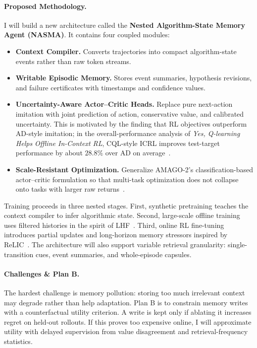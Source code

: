 \documentclass[10pt,twocolumn,letterpaper]{article}
\begin{document}
\paragraph{Proposed Methodology.}
I will build a new architecture called the \textbf{Nested Algorithm-State Memory Agent (NASMA)}. It contains four coupled modules:
\begin{itemize}[leftmargin=1.2em]
\item \textbf{Context Compiler.} Converts trajectories into compact algorithm-state events rather than raw token streams.
\item \textbf{Writable Episodic Memory.} Stores event summaries, hypothesis revisions, and failure certificates with timestamps and confidence values.
\item \textbf{Uncertainty-Aware Actor--Critic Heads.} Replace pure next-action imitation with joint prediction of action, conservative value, and calibrated uncertainty. This is motivated by the finding that RL objectives outperform AD-style imitation; in the overall-performance analysis of \emph{Yes, Q-learning Helps Offline In-Context RL}, CQL-style ICRL improves test-target performance by about \(28.8\%\) over AD on average~\cite{tarasov2025qlearning}.
\item \textbf{Scale-Resistant Optimization.} Generalize AMAGO-2's classification-based actor--critic formulation so that multi-task optimization does not collapse onto tasks with larger raw returns~\cite{grigsby2024amago2}.
\end{itemize}

Training proceeds in three nested stages. First, synthetic pretraining teaches the context compiler to infer algorithmic state. Second, large-scale offline training uses filtered histories in the spirit of LHF~\cite{chen2025lhf}. Third, online RL fine-tuning introduces partial updates and long-horizon memory stressors inspired by ReLIC~\cite{elawady2024relic}. The architecture will also support variable retrieval granularity: single-transition cues, event summaries, and whole-episode capsules.

\paragraph{Challenges \& Plan B.}
The hardest challenge is memory pollution: storing too much irrelevant context may degrade rather than help adaptation. Plan B is to constrain memory writes with a counterfactual utility criterion. A write is kept only if ablating it increases regret on held-out rollouts. If this proves too expensive online, I will approximate utility with delayed supervision from value disagreement and retrieval-frequency statistics.
\end{document}
